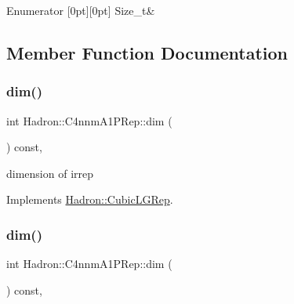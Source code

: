\begin{DoxyEnumFields}{Enumerator}
[0pt][0pt]{}\mbox{\label{structHadron_1_1C4nnmA1PRep_a4633f1ae5d63e4118eb92aa8f24d7a72ace6299e84a9d4de7de2e764a00722404}} 
Size\+\_\+t&\\
\hline

\end{DoxyEnumFields}


\subsection{Member Function Documentation}
\mbox{\label{structHadron_1_1C4nnmA1PRep_ad5f1c0aaa30200d50b2d1e6b9d05a0b5}} 
\subsubsection{\texorpdfstring{dim()}{dim()}\hspace{0.1cm}{\footnotesize\ttfamily [1/3]}}
{\footnotesize\ttfamily int Hadron\+::\+C4nnm\+A1\+P\+Rep\+::dim (\begin{DoxyParamCaption}{ }\end{DoxyParamCaption}) const\hspace{0.3cm}{\ttfamily [inline]}, {\ttfamily [virtual]}}

dimension of irrep 

Implements \mbox{\hyperlink{structHadron_1_1CubicLGRep_a3acbaea26503ed64f20df693a48e4cdd}{Hadron\+::\+Cubic\+L\+G\+Rep}}.

\mbox{\label{structHadron_1_1C4nnmA1PRep_ad5f1c0aaa30200d50b2d1e6b9d05a0b5}} 
\subsubsection{\texorpdfstring{dim()}{dim()}\hspace{0.1cm}{\footnotesize\ttfamily [2/3]}}
{\footnotesize\ttfamily int Hadron\+::\+C4nnm\+A1\+P\+Rep\+::dim (\begin{DoxyParamCaption}{ }\end{DoxyParamCaption}) const\hspace{0.3cm}{\ttfamily [inline]}, {\ttfamily [virtual]}}

